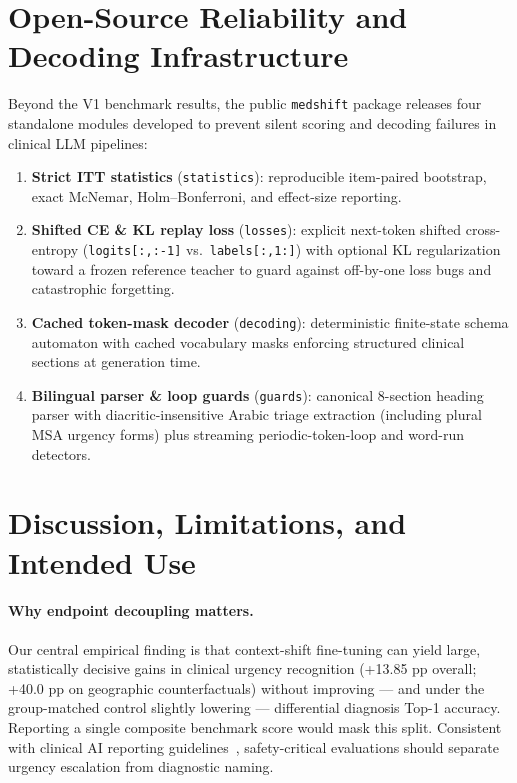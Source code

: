 \documentclass[10pt,twocolumn]{article}
\begin{document}
\section{Open-Source Reliability and Decoding Infrastructure}
Beyond the V1 benchmark results, the public \texttt{medshift} package releases four standalone modules developed to prevent silent scoring and decoding failures in clinical LLM pipelines:
\begin{enumerate}
  \item \textbf{Strict ITT statistics} (\texttt{statistics}): reproducible item-paired bootstrap, exact McNemar, Holm--Bonferroni, and effect-size reporting.
  \item \textbf{Shifted CE \& KL replay loss} (\texttt{losses}): explicit next-token shifted cross-entropy (\texttt{logits[:,:-1]} vs.\ \texttt{labels[:,1:]}) with optional KL regularization toward a frozen reference teacher to guard against off-by-one loss bugs and catastrophic forgetting.
  \item \textbf{Cached token-mask decoder} (\texttt{decoding}): deterministic finite-state schema automaton with cached vocabulary masks enforcing structured clinical sections at generation time.
  \item \textbf{Bilingual parser \& loop guards} (\texttt{guards}): canonical 8-section heading parser with diacritic-insensitive Arabic triage extraction (including plural MSA urgency forms) plus streaming periodic-token-loop and word-run detectors.
\end{enumerate}

\section{Discussion, Limitations, and Intended Use}

\paragraph{Why endpoint decoupling matters.}
Our central empirical finding is that context-shift fine-tuning can yield large, statistically decisive gains in clinical urgency recognition (+13.85 pp overall; +40.0 pp on geographic counterfactuals) without improving --- and under the group-matched control slightly lowering --- differential diagnosis Top-1 accuracy. Reporting a single composite benchmark score would mask this split. Consistent with clinical AI reporting guidelines~\cite{collins2024tripodai}, safety-critical evaluations should separate urgency escalation from diagnostic naming.
\end{document}
